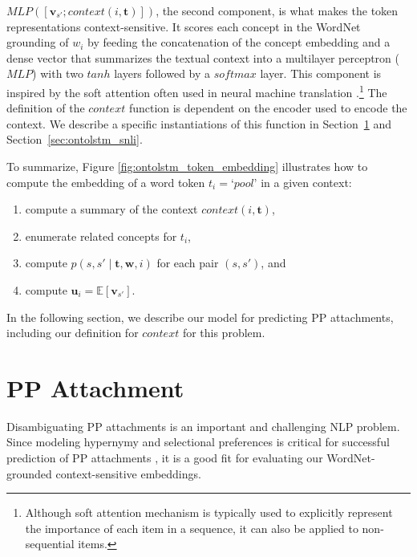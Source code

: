 $\textit{MLP}( [\mathbf{v}_{s'}; \textit{context}(i, \boldsymbol{t})])$, the second component, is what makes the token representations context-sensitive. 
It scores each concept in the WordNet grounding of $w_i$ by feeding the concatenation of the concept embedding and a dense vector that summarizes the textual context into a multilayer perceptron ($\textit{MLP}$) with two $tanh$ layers followed by a $softmax$ layer.
This component is inspired by the soft attention often used in neural machine translation \citep{bahdanau:14}.\footnote{Although soft attention mechanism is typically used to explicitly represent the importance of each item in a sequence, it can also be applied to non-sequential items.} The definition of the $\textit{context}$ function is dependent on the encoder used to encode the context.
We describe a specific instantiations of this function in Section~\ref{sec:ontolstm_pp_model} and Section~\ref{sec:ontolstm_snli}.

To summarize, Figure \ref{fig:ontolstm_token_embedding} illustrates how to compute the embedding of a word token $t_i=\textit{`pool'}$ in a given context:
\begin{enumerate}
    \item compute a summary of the context $\textit{context}(i, \boldsymbol{t})$,
    \item enumerate related concepts for $t_i$,
    \item compute $p(s,s'\mid \boldsymbol{t}, \boldsymbol{w}, i)$ for each pair $(s,s')$, and
    \item compute $\mathbf{u}_i = \mathbb{E}[\mathbf{v}_{s'}]$.
\end{enumerate}

In the following section, we describe our model for predicting PP attachments, including our definition for $\textit{context}$ for this problem.

\section{PP Attachment}
\label{sec:ontolstm_pp_model}
Disambiguating PP attachments is an important and challenging NLP problem. Since modeling hypernymy and selectional preferences is critical for successful prediction of PP attachments \citep{resnik:93}, it is a good fit for evaluating our WordNet-grounded context-sensitive embeddings.

